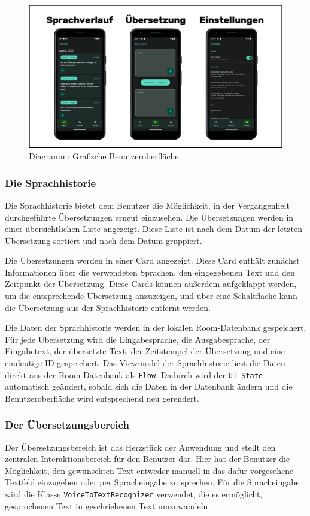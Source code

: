 \begin{figure}[H]
    \includegraphics[scale=1, center]{resources/diagram_graphics_v02.png}
    \caption[Diagramm: Grafische Benutzeroberfläche]{Diagramm: Grafische Benutzeroberfläche}
\end{figure}

\subsubsection{Die Sprachhistorie}
Die Sprachhistorie bietet dem Benutzer die Möglichkeit, in der Vergangenheit durchgeführte Übersetzungen erneut einzusehen. Die Übersetzungen werden in einer übersichtlichen Liste angezeigt. Diese Liste ist nach dem Datum der letzten Übersetzung sortiert und nach dem Datum gruppiert.

Die Übersetzungen werden in einer Card angezeigt. Diese Card enthält zunächst Informationen über die verwendeten Sprachen, den eingegebenen Text und den Zeitpunkt der Übersetzung. Diese Cards können außerdem aufgeklappt werden, um die entsprechende Übersetzung anzuzeigen, und über eine Schaltfläche kann die Übersetzung aus der Sprachhistorie entfernt werden.

Die Daten der Sprachhistorie werden in der lokalen Room-Datenbank gespeichert. Für jede Übersetzung wird die Eingabesprache, die Ausgabesprache, der Eingabetext, der übersetzte Text, der Zeitstempel der Übersetzung und eine eindeutige ID gespeichert. Das Viewmodel der Sprachhistorie liest die Daten direkt aus der Room-Datenbank als \texttt{Flow}. Dadurch wird der \texttt{UI-State} automatisch geändert, sobald sich die Daten in der Datenbank ändern und die Benutzeroberfläche wird entsprechend neu gerendert.

\subsubsection{Der Übersetzungsbereich}
Der Übersetzungsbereich ist das Herzstück der Anwendung und stellt den zentralen Interaktionsbereich für den Benutzer dar. Hier hat der Benutzer die Möglichkeit, den gewünschten Text entweder manuell in das dafür vorgesehene Textfeld einzugeben oder per Spracheingabe zu sprechen. Für die Spracheingabe wird die Klasse \texttt{VoiceToTextRecognizer} verwendet, die es ermöglicht, gesprochenen Text in geschriebenen Text umzuwandeln.

